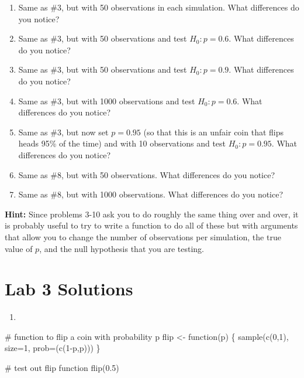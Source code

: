 \documentclass[
  letterpaper,
  DIV=11,
  numbers=noendperiod]{scrreprt}
\newenvironment{Shaded}{\begin{snugshade}}{\end{snugshade}}
\newcommand{\AttributeTok}[1]{\textcolor[rgb]{0.40,0.45,0.13}{#1}}
\newcommand{\CommentTok}[1]{\textcolor[rgb]{0.37,0.37,0.37}{#1}}
\newcommand{\ControlFlowTok}[1]{\textcolor[rgb]{0.00,0.23,0.31}{#1}}
\newcommand{\DecValTok}[1]{\textcolor[rgb]{0.68,0.00,0.00}{#1}}
\newcommand{\FloatTok}[1]{\textcolor[rgb]{0.68,0.00,0.00}{#1}}
\newcommand{\FunctionTok}[1]{\textcolor[rgb]{0.28,0.35,0.67}{#1}}
\newcommand{\NormalTok}[1]{\textcolor[rgb]{0.00,0.23,0.31}{#1}}
\newcommand{\OtherTok}[1]{\textcolor[rgb]{0.00,0.23,0.31}{#1}}
\newcommand{\SpecialCharTok}[1]{\textcolor[rgb]{0.37,0.37,0.37}{#1}}
\providecommand{\tightlist}{%
  \setlength{\itemsep}{0pt}\setlength{\parskip}{0pt}}\usepackage{longtable,booktabs,array}
\begin{document}
\begin{enumerate}
\def\labelenumi{\arabic{enumi}.}
\setcounter{enumi}{3}
\item
  Same as \#3, but with 50 observations in each simulation. What
  differences do you notice?
\item
  Same as \#3, but with 50 observations and test \(H_0:p=0.6\). What
  differences do you notice?
\item
  Same as \#3, but with 50 observations and test \(H_0:p=0.9\). What
  differences do you notice?
\item
  Same as \#3, but with 1000 observations and test \(H_0:p=0.6\). What
  differences do you notice?
\item
  Same as \#3, but now set \(p=0.95\) (so that this is an unfair coin
  that flips heads 95\% of the time) and with 10 observations and test
  \(H_0:p=0.95\). What differences do you notice?
\item
  Same as \#8, but with 50 observations. What differences do you notice?
\item
  Same as \#8, but with 1000 observations. What differences do you
  notice?
\end{enumerate}

\textbf{Hint:} Since problems 3-10 ask you to do roughly the same thing
over and over, it is probably useful to try to write a function to do
all of these but with arguments that allow you to change the number of
observations per simulation, the true value of \(p\), and the null
hypothesis that you are testing.

\section{Lab 3 Solutions}\label{lab-3-solutions}

\begin{enumerate}
\def\labelenumi{\arabic{enumi}.}
\tightlist
\item
\end{enumerate}

\begin{Shaded}
\begin{Highlighting}[]
\CommentTok{\# function to flip a coin with probability p}
\NormalTok{flip }\OtherTok{\textless{}{-}} \ControlFlowTok{function}\NormalTok{(p) \{}
  \FunctionTok{sample}\NormalTok{(}\FunctionTok{c}\NormalTok{(}\DecValTok{0}\NormalTok{,}\DecValTok{1}\NormalTok{), }\AttributeTok{size=}\DecValTok{1}\NormalTok{, }\AttributeTok{prob=}\NormalTok{(}\FunctionTok{c}\NormalTok{(}\DecValTok{1}\SpecialCharTok{{-}}\NormalTok{p,p)))}
\NormalTok{\}}

\CommentTok{\# test out flip function}
\FunctionTok{flip}\NormalTok{(}\FloatTok{0.5}\NormalTok{)}
\end{Highlighting}
\end{Shaded}
\end{document}
